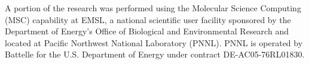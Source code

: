 \documentclass{sigplanconf}
\begin{document}
%

\acks

A portion of the research was performed using the Molecular Science Computing
(MSC) capability at EMSL, a national scientific user facility sponsored by the
Department of Energy’s Office of Biological and Environmental Research and
located at Pacific Northwest National Laboratory (PNNL). PNNL is operated by
Battelle for the U.S. Department of Energy under contract DE-AC05-76RL01830.




\end{document}
